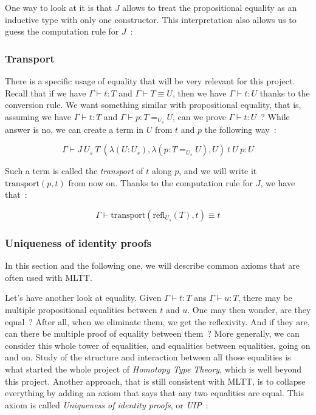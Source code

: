 One way to look at it is that $J$ allows to treat the propositional equality as
an inductive type with only one constructor. This interpretation also allows us
to guess the computation rule for $J$~:

\begin{center}\begin{prooftree}
\end{prooftree}\end{center}

\subsubsection{Transport}\label{transport}

There is a specific usage of equality that will be very relevant for this
project. Recall that if we have $\Gamma\vdash t : T$ and $\Gamma\vdash T \equiv
U$, then we have $\Gamma\vdash t : U$ thanks to the conversion rule. We want
something similar with propositional equality, that is, assuming we have
$\Gamma\vdash t : T$ and $\Gamma\vdash p : T =_{U_{s}} U$, can we prove
$\Gamma\vdash t : U$~? While answer is no, we can create a term in $U$ from $t$
and $p$ the following way~:

\[\Gamma\vdash J\ U_{s}\ T\ (\lambda(U : U_{s}), \lambda(p : T =_{U_{s}} U), U)\ t\ U\ p : U\]

Such a term is called the \emph{transport} of $t$ along $p$, and we will write
it $\text{transport}(p,t)$ from now on. Thanks to the computation rule for $J$,
we have that~:

\[\Gamma\vdash\text{transport}(\text{refl}_{U_{s}}(T),t) \equiv t\]

\subsubsection{Uniqueness of identity proofs}\label{uip}

In this section and the following one, we will describe common axioms that are
often used with MLTT.

Let's have another look at equality. Given $\Gamma\vdash t : T$ ans $\Gamma\vdash u : T$, there may
be multiple propositional equalities between $t$ and $u$. One may then wonder,
are they equal~? After all, when we eliminate them, we get the reflexivity. And
if they are, can there be multiple proof of equality between them~? More
generally, we can consider this whole tower of equalities, and equalities
between equalities, going on and on. Study of the structure and interaction
between all those equalities is what started the whole project of \emph{Homotopy
Type Theory}, which is well beyond this project. Another approach, that is still
consistent with MLTT, is to collapse everything by adding an axiom that says
that any two equalities are equal. This axiom is called \emph{Uniqueness of
identity proofs}, or \emph{UIP}~:

